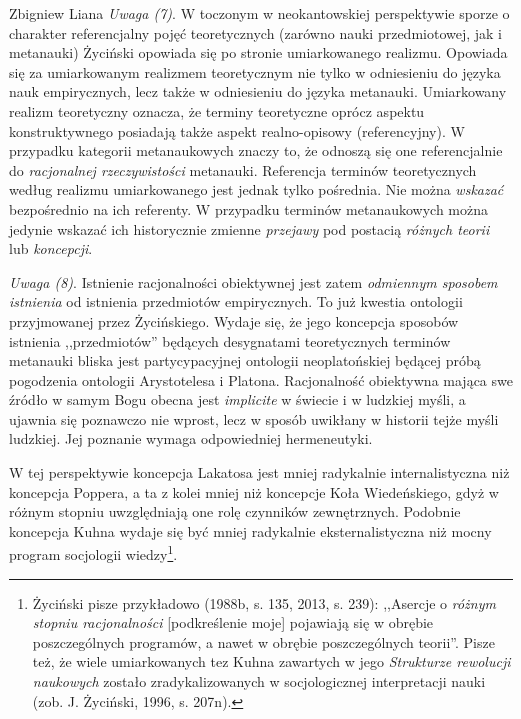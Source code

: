 \begin{artplenv}{Zbigniew Liana}
\textit{Uwaga (7)}. W toczonym w neokantowskiej perspektywie sporze o charakter referencjalny pojęć teoretycznych (zarówno
nauki przedmiotowej, jak i metanauki) Życiński opowiada się po stronie umiarkowanego realizmu. Opowiada się za
umiarkowanym realizmem teoretycznym nie tylko w odniesieniu do języka nauk empirycznych, lecz także w odniesieniu do
języka metanauki. Umiarkowany realizm teoretyczny oznacza, że terminy teoretyczne oprócz aspektu konstruktywnego
posiadają także aspekt realno-opisowy (referencyjny). W przypadku kategorii metanaukowych znaczy to, że odnoszą się one
referencjalnie do \textit{racjonalnej rzeczywistości} metanauki. Referencja terminów teoretycznych według realizmu
umiarkowanego jest jednak tylko pośrednia. Nie można \textit{wskazać }bezpośrednio na ich referenty. W przypadku terminów
metanaukowych można jedynie wskazać ich historycznie zmienne \textit{przejawy} pod postacią \textit{różnych teorii
}lub\textit{ koncepcji}.

\textit{Uwaga (8)}. Istnienie racjonalności obiektywnej jest zatem \textit{odmiennym sposobem istnienia} od istnienia
przedmiotów empirycznych. To już kwestia ontologii przyjmowanej przez Życińskiego. Wydaje się, że jego koncepcja
sposobów istnienia ,,przedmiotów'' będących desygnatami teoretycznych terminów metanauki bliska jest partycypacyjnej
ontologii neoplatońskiej będącej próbą pogodzenia ontologii Arystotelesa i Platona. Racjonalność obiektywna mająca swe
źródło w samym Bogu obecna jest \textit{implicite} w świecie i w ludzkiej myśli, a ujawnia się poznawczo nie wprost, lecz
w sposób uwikłany w historii tejże myśli ludzkiej. Jej poznanie wymaga odpowiedniej hermeneutyki.

W tej perspektywie koncepcja Lakatosa jest mniej radykalnie internalistyczna niż koncepcja Poppera, a ta z kolei mniej
niż koncepcje Koła Wiedeńskiego, gdyż w różnym stopniu uwzględniają one rolę czynników zewnętrznych. Podobnie koncepcja
Kuhna wydaje się być mniej radykalnie eksternalistyczna niż mocny program socjologii wiedzy\footnote{Życiński pisze
	przykładowo \label{ref:RNDMFFbOpIuQe}(1988b, s. 135, 2013, s. 239): ,,Asercje o \textit{różnym stopniu racjonalności}
	[podkreślenie moje] pojawiają się w obrębie poszczególnych programów, a nawet w obrębie poszczególnych teorii''.  Pisze
	też, że wiele umiarkowanych tez Kuhna zawartych w jego \textit{Strukturze rewolucji naukowych} zostało zradykalizowanych
	w socjologicznej interpretacji nauki \label{ref:RND7QncKOKY2H}(zob. J. Życiński, 1996, s. 207n).}.


\end{artplenv}
